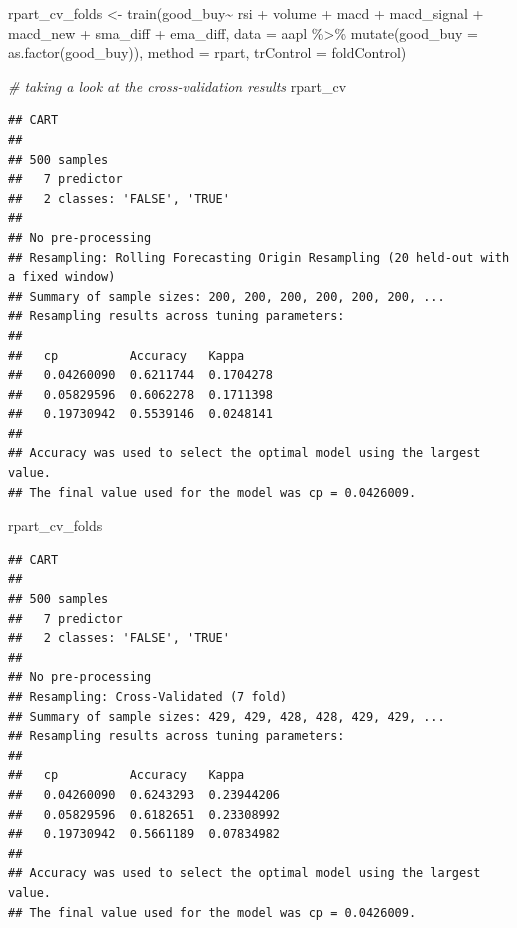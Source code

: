 \documentclass[
]{article}
\newenvironment{Shaded}{\begin{snugshade}}{\end{snugshade}}
\newcommand{\AttributeTok}[1]{\textcolor[rgb]{0.77,0.63,0.00}{#1}}
\newcommand{\CommentTok}[1]{\textcolor[rgb]{0.56,0.35,0.01}{\textit{#1}}}
\newcommand{\FunctionTok}[1]{\textcolor[rgb]{0.00,0.00,0.00}{#1}}
\newcommand{\NormalTok}[1]{#1}
\newcommand{\OtherTok}[1]{\textcolor[rgb]{0.56,0.35,0.01}{#1}}
\newcommand{\SpecialCharTok}[1]{\textcolor[rgb]{0.00,0.00,0.00}{#1}}
\newcommand{\StringTok}[1]{\textcolor[rgb]{0.31,0.60,0.02}{#1}}
\begin{document}
\begin{Shaded}
\begin{Highlighting}[]
\NormalTok{rpart\_cv\_folds }\OtherTok{\textless{}{-}} \FunctionTok{train}\NormalTok{(good\_buy}\SpecialCharTok{\textasciitilde{}}\NormalTok{ rsi }\SpecialCharTok{+}\NormalTok{ volume }\SpecialCharTok{+}\NormalTok{ macd }\SpecialCharTok{+}\NormalTok{ macd\_signal }\SpecialCharTok{+}\NormalTok{ macd\_new }\SpecialCharTok{+}\NormalTok{ sma\_diff }\SpecialCharTok{+}\NormalTok{ ema\_diff, }\AttributeTok{data =}\NormalTok{ aapl }\SpecialCharTok{\%\textgreater{}\%} \FunctionTok{mutate}\NormalTok{(}\AttributeTok{good\_buy =} \FunctionTok{as.factor}\NormalTok{(good\_buy)), }\AttributeTok{method =} \StringTok{\textquotesingle{}rpart\textquotesingle{}}\NormalTok{, }\AttributeTok{trControl =}\NormalTok{ foldControl)}

\CommentTok{\# taking a look at the cross{-}validation results}
\NormalTok{rpart\_cv}
\end{Highlighting}
\end{Shaded}

\begin{verbatim}
## CART 
## 
## 500 samples
##   7 predictor
##   2 classes: 'FALSE', 'TRUE' 
## 
## No pre-processing
## Resampling: Rolling Forecasting Origin Resampling (20 held-out with a fixed window) 
## Summary of sample sizes: 200, 200, 200, 200, 200, 200, ... 
## Resampling results across tuning parameters:
## 
##   cp          Accuracy   Kappa    
##   0.04260090  0.6211744  0.1704278
##   0.05829596  0.6062278  0.1711398
##   0.19730942  0.5539146  0.0248141
## 
## Accuracy was used to select the optimal model using the largest value.
## The final value used for the model was cp = 0.0426009.
\end{verbatim}

\begin{Shaded}
\begin{Highlighting}[]
\NormalTok{rpart\_cv\_folds}
\end{Highlighting}
\end{Shaded}

\begin{verbatim}
## CART 
## 
## 500 samples
##   7 predictor
##   2 classes: 'FALSE', 'TRUE' 
## 
## No pre-processing
## Resampling: Cross-Validated (7 fold) 
## Summary of sample sizes: 429, 429, 428, 428, 429, 429, ... 
## Resampling results across tuning parameters:
## 
##   cp          Accuracy   Kappa     
##   0.04260090  0.6243293  0.23944206
##   0.05829596  0.6182651  0.23308992
##   0.19730942  0.5661189  0.07834982
## 
## Accuracy was used to select the optimal model using the largest value.
## The final value used for the model was cp = 0.0426009.
\end{verbatim}
\end{document}
